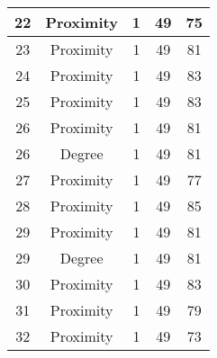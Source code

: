 \documentclass[results.tex]{subfiles}
\begin{document}
\begin{center}
\begin{tabular}{| c || c | c | c | c |}
            \hline
            22                      & Proximity                    & 1                      & 49                      & 75                   \\
            \hline
            23                      & Proximity                    & 1                      & 49                      & 81                   \\
            \hline
            24                      & Proximity                    & 1                      & 49                      & 83                   \\
            \hline
            25                      & Proximity                    & 1                      & 49                      & 83                   \\
            \hline
            26                      & Proximity                    & 1                      & 49                      & 81                   \\
            \hline
            26                      & Degree                       & 1                      & 49                      & 81                   \\
            \hline
            27                      & Proximity                    & 1                      & 49                      & 77                   \\
            \hline
            28                      & Proximity                    & 1                      & 49                      & 85                   \\
            \hline
            29                      & Proximity                    & 1                      & 49                      & 81                   \\
            \hline
            29                      & Degree                       & 1                      & 49                      & 81                   \\
            \hline
            30                      & Proximity                    & 1                      & 49                      & 83                   \\
            \hline
            31                      & Proximity                    & 1                      & 49                      & 79                   \\
            \hline
            32                      & Proximity                    & 1                      & 49                      & 73                   \\

\end{tabular}
\end{center}
\end{document}
